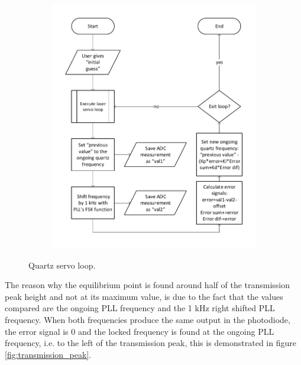 \documentclass[a4paper,12pt]{article}
\newcounter{step}
\begin{document}
\begin{figure}[!h]
\centering
\begin{subfigure}[c]{0.49\textwidth}
	\centering
	\captionsetup{justification=centering}
\end{subfigure}
\hfill
\begin{subfigure}[c]{0.49\textwidth}
	\centering
	\includegraphics[width=\textwidth]{Images/Quartz_Servo_loop_flowchart.pdf}
	\captionsetup{justification=centering}
\end{subfigure}
 \caption{Quartz servo loop.}
\label{fig:quartz_servo_loop}
\end{figure}

The reason why the equilibrium point is found around half of the transmission peak height and not at its maximum value, is due to the fact that the values compared are the ongoing PLL frequency and the 1 kHz right shifted PLL frequency. When both frequencies produce the same output in the photodiode, the error signal is 0 and the locked frequency is found at the ongoing PLL frequency, i.e. to the left of the transmission peak, this is demonstrated in figure \ref{fig:transmission_peak}.
\end{document}
